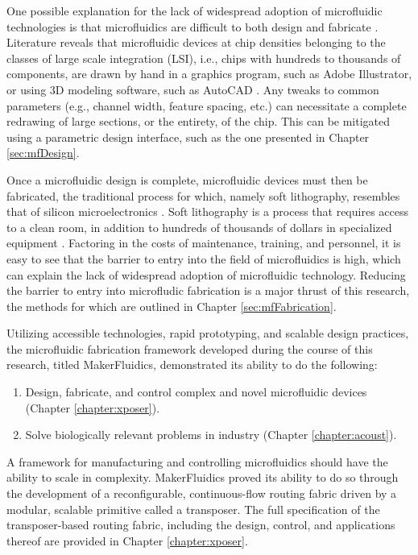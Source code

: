 One possible explanation for the lack of widespread adoption of microfluidic technologies is that microfluidics are difficult to both design and fabricate \cite{whitesides2006}. Literature reveals that microfluidic devices at chip densities belonging to the classes of large scale integration (LSI), i.e., chips with hundreds to thousands of components, are drawn by hand in a graphics program, such as Adobe Illustrator, or using 3D modeling software, such as AutoCAD \cite{araci2014}. Any tweaks to common parameters (e.g., channel width, feature spacing, etc.) can necessitate a complete redrawing of large sections, or the entirety, of the chip. This can be mitigated using a parametric design interface, such as the one presented in Chapter \ref{sec:mfDesign}. 

Once a microfluidic design is complete, microfluidic devices must then be fabricated, the traditional process for which, namely soft lithography, resembles that of silicon microelectronics \cite{anderson2000fabrication}. Soft lithography is a process that requires access to a clean room, in addition to hundreds of thousands of dollars in specialized equipment \cite{xia1998soft}. Factoring in the costs of maintenance, training, and personnel, it is easy to see that the barrier to entry into the field of microfluidics is high, which can explain the lack of widespread adoption of microfluidic technology. Reducing the barrier to entry into microfludic fabrication is a major thrust of this research, the methods for which are outlined in Chapter \ref{sec:mfFabrication}.

Utilizing accessible technologies, rapid prototyping, and scalable design practices, the microfluidic fabrication framework developed during the course of this research, titled MakerFluidics, demonstrated its ability to do the following:
\begin{enumerate}
	\item Design, fabricate, and control complex and novel microfluidic devices (Chapter \ref{chapter:xposer}).
	\item Solve biologically relevant problems in industry (Chapter \ref{chapter:acoust}).
\end{enumerate}

A framework for manufacturing and controlling microfluidics should have the ability to scale in complexity. MakerFluidics proved its ability to do so through the development of a reconfigurable, continuous-flow routing fabric driven by a modular, scalable primitive called a transposer. The full specification of the transposer-based routing fabric, including the design, control, and applications thereof are provided in Chapter \ref{chapter:xposer}. 

